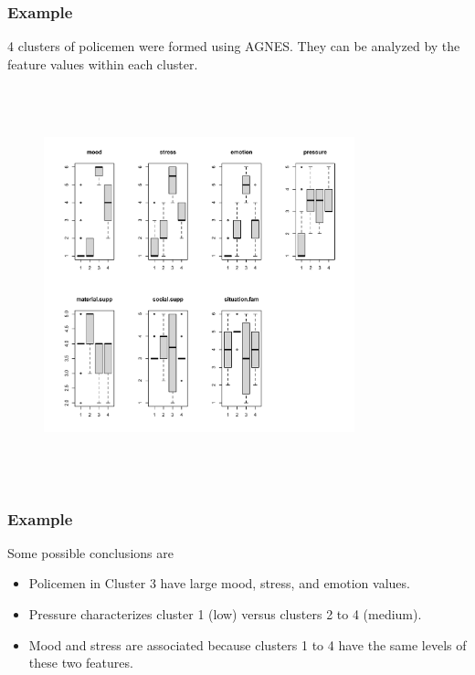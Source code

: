 \begin{frame}
\frametitle{Example}
4 clusters of policemen were formed using AGNES. They can be analyzed by the feature values within each cluster. 
 \vspace{-1cm}
 \begin{figure}[!h]
 \centerline{\includegraphics[width=9cm, height=11.5cm]{../../Graphs/Polstress-groups-4.png}}
  \end{figure}
\end{frame}
\begin{frame}
\frametitle{Example}
Some possible conclusions are
\begin{itemize}
\item Policemen in Cluster 3 have large mood, stress, and emotion values. 
\item Pressure characterizes cluster 1 (low) versus clusters 2 to 4 (medium).
\item Mood and stress are associated because clusters 1 to 4 have the same levels of these two features.
\end{itemize}
\end{frame}


